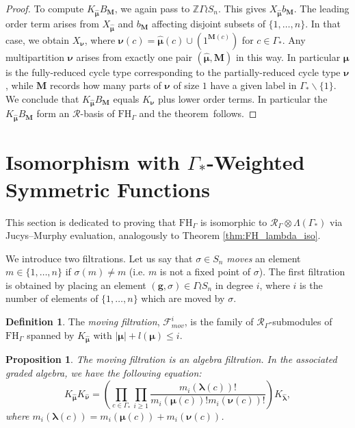 \documentclass[10pt]{article}
\newtheorem{proposition}[theorem]{Proposition}
\theoremstyle{definition}
\newtheorem{definition}[theorem]{Definition}
\newcommand{\bs}{\boldsymbol}
\newcommand{\RGamma}{\mathcal{R}_{\Gamma}}
\newcommand{\LambdaG}{\Lambda(\Gamma_*)}
\newcommand{\FHG}{\mathrm{FH}_{\Gamma}}
\begin{document}
\begin{proof}
To compute $K_{\bm\hat{\bs\mu}}B_{\mathbf{M}}$, we again pass to $\mathbb{Z}\Gamma \wr S_n$. This gives $X_{\bm\hat{\bs\mu}}b_{\mathbf{M}}$. The leading order term arises from $X_{\bm\hat{\bs\mu}}$ and $b_{\mathbf{M}}$ affecting disjoint subsets of $\{1,\ldots, n\}$. In that case, we obtain $X_{\bs \nu}$, where $\bs \nu(c) = \bm \hat{\bs \mu}(c) \cup (1^{\mathbf{M}(c)})$ for $c \in \Gamma_*$. Any multipartition $\bs \nu$ arises from exactly one pair $(\bm\hat{\bs\mu}, \mathbf{M})$ in this way. In particular $\bs \mu$ is the fully-reduced cycle type corresponding to the partially-reduced cycle type $\bs \nu$, while $\mathbf{M}$ records how many parts of $\bs \nu$ of size $1$ have a given label in $\Gamma_*\backslash\{1\}$. We conclude that $K_{\bm\hat{\bs\mu}}B_{\mathbf{M}}$ equals $K_{\bs \nu}$ plus lower order terms. In particular the $K_{\bm\hat{\bs\mu}}B_{\mathbf{M}}$ form an $\mathcal{R}$-basis of $\FHG$ and the theorem~follows.
\end{proof}

\section{Isomorphism with \texorpdfstring{$\Gamma_*$}{Gamma*}-Weighted Symmetric Functions}\label{sec:6}

This section is dedicated to proving that $\FHG$ is isomorphic to $\RGamma \otimes \LambdaG$ via Jucys--Murphy evaluation, analogously to Theorem \ref{thm:FH_lambda_iso}.

We introduce two filtrations. Let us say that $\sigma \in S_n$ \emph{moves} an element $m \in \{1,\ldots, n\}$ if $\sigma(m) \neq m$ (i.e. $m$ is not a fixed point of $\sigma$). The first filtration is obtained by placing an element $(\mathbf{g}, \sigma) \in \Gamma \wr S_n$ in degree $i$, where $i$ is the number of elements of $\{1, \ldots, n\}$ which are moved by $\sigma$. 
\begin{definition}
The \emph{moving filtration}, $\mathcal{F}_{mov}^i$, is the family of $\RGamma$-submodules of $\FHG$ spanned by $K_{\bm\hat{\bs \mu}}$ with $|\bs \mu| + l(\bs \mu) \leq i$.
\end{definition}

\begin{proposition} \label{moving_filt_prop}
The moving filtration is an algebra filtration. In the associated graded algebra, we have the following equation:
\[
K_{\bm\hat{\bs \mu}}K_{\bm\hat{\bs \nu}} = \left( \prod_{c \in \Gamma_*} \prod_{i \geq 1} \frac{m_i(\bs\lambda(c))!}{m_i(\bs\mu(c))!m_i(\bs\nu(c))!}\right) K_{\bm\hat{\bs \lambda}},
\]
where $m_i(\bs\lambda(c)) = m_i(\bs\mu(c)) + m_i(\bs\nu(c))$.
\end{proposition}
\end{document}
